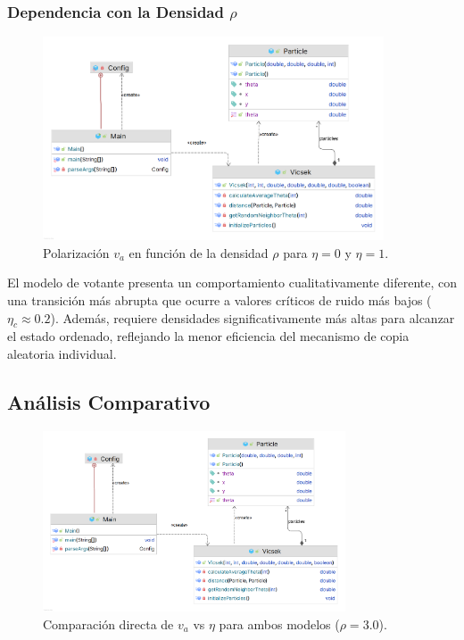 \documentclass{article}
\begin{document}
\subsubsection{Dependencia con la Densidad $\rho$}
\begin{figure}[H]
\centering
\includegraphics[width=0.9\textwidth]{TP2_UML.png}
\caption{Polarización $v_a$ en función de la densidad $\rho$ para $\eta = 0$ y $\eta = 1$.}
\label{fig:va_vs_rho_voter}
\end{figure}

El modelo de votante presenta un comportamiento cualitativamente diferente, con una transición más abrupta que ocurre a valores críticos de ruido más bajos ($\eta_c \approx 0.2$). Además, requiere densidades significativamente más altas para alcanzar el estado ordenado, reflejando la menor eficiencia del mecanismo de copia aleatoria individual.

\subsection{Análisis Comparativo}
\begin{figure}[H]
\centering
\includegraphics[width=0.8\textwidth]{TP2_UML.png}
\caption{Comparación directa de $v_a$ vs $\eta$ para ambos modelos ($\rho = 3.0$).}
\label{fig:comparacion_modelos}
\end{figure}
\end{document}
